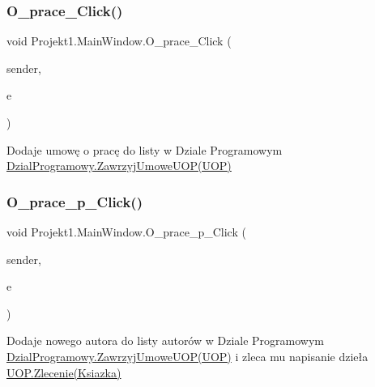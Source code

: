 \subsubsection{\texorpdfstring{O\_prace\_Click()}{O\_prace\_Click()}}
{\footnotesize\ttfamily void Projekt1.\+Main\+Window.\+O\+\_\+prace\+\_\+\+Click (\begin{DoxyParamCaption}\item[{object}]{sender,  }\item[{Routed\+Event\+Args}]{e }\end{DoxyParamCaption})\hspace{0.3cm}{\ttfamily [private]}}



Dodaje umowę o pracę do listy w Dziale Programowym \mbox{\hyperlink{class_projekt1_1_1_dzial_programowy_a7814d93c057013c72d4b5f7153ed3530}{Dzial\+Programowy.\+Zawrzyj\+Umowe\+U\+O\+P(\+U\+O\+P)}} 

\mbox{\label{class_projekt1_1_1_main_window_a8da41bd3feb26166db071d7e500a9cc4}} 
\subsubsection{\texorpdfstring{O\_prace\_p\_Click()}{O\_prace\_p\_Click()}}
{\footnotesize\ttfamily void Projekt1.\+Main\+Window.\+O\+\_\+prace\+\_\+p\+\_\+\+Click (\begin{DoxyParamCaption}\item[{object}]{sender,  }\item[{Routed\+Event\+Args}]{e }\end{DoxyParamCaption})\hspace{0.3cm}{\ttfamily [private]}}



Dodaje nowego autora do listy autorów w Dziale Programowym \mbox{\hyperlink{class_projekt1_1_1_dzial_programowy_a7814d93c057013c72d4b5f7153ed3530}{Dzial\+Programowy.\+Zawrzyj\+Umowe\+U\+O\+P(\+U\+O\+P)}} i zleca mu napisanie dzieła \mbox{\hyperlink{class_projekt1_1_1_u_o_p_aa2f46bfc4700f601a35eaa4d99b21727}{U\+O\+P.\+Zlecenie(\+Ksiazka)}} 

\mbox{\label{class_projekt1_1_1_main_window_a90f50a8cc16ea210ea79ccb7643dee0b}} 

